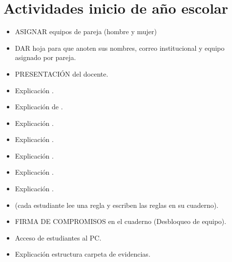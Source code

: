 \documentclass[letterpaper,10pt,spanish]{sphinxmanual}
\begin{document}
\section{Actividades inicio de año escolar}
\label{\detokenize{informacion:actividades-inicio-de-ano-escolar}}\begin{itemize}
\item {} 
\sphinxAtStartPar
 ASIGNAR equipos de pareja (hombre y mujer)

\item {} 
\sphinxAtStartPar
 DAR hoja para que anoten sus nombres, correo institucional y equipo asignado por pareja.

\item {} 
\sphinxAtStartPar
 PRESENTACIÓN del docente.

\item {} 
\sphinxAtStartPar
 Explicación .

\item {} 
\sphinxAtStartPar
 Explicación de .

\item {} 
\sphinxAtStartPar
 Explicación .

\item {} 
\sphinxAtStartPar
 Explicación .

\item {} 
\sphinxAtStartPar
 Explicación .

\item {} 
\sphinxAtStartPar
 Explicación .

\item {} 
\sphinxAtStartPar
 Explicación .

\item {} 
\sphinxAtStartPar
  (cada estudiante lee una regla y escriben las reglas en su cuaderno).

\item {} 
\sphinxAtStartPar
 FIRMA DE COMPROMISOS en el cuaderno (Desbloqueo de equipo).

\item {} 
\sphinxAtStartPar
 Acceso de estudiantes al PC.

\item {} 
\sphinxAtStartPar
 Explicación estructura carpeta de evidencias.

\end{itemize}
\end{document}
